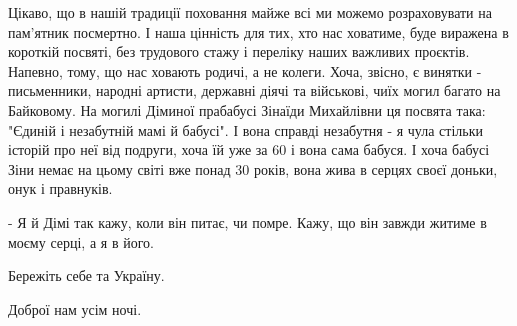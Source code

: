Цікаво, що в нашій традиції поховання майже всі ми можемо розраховувати на
пам'ятник посмертно. І наша цінність для тих, хто нас ховатиме, буде виражена в
короткій посвяті, без трудового стажу і переліку наших важливих проєктів.
Напевно, тому, що нас ховають родичі, а не колеги. Хоча, звісно, є винятки -
письменники, народні артисти, державні діячі та військові, чиїх могил багато на
Байковому. На могилі Діминої прабабусі Зінаїди Михайлівни ця посвята така:
"Єдиній і незабутній мамі й бабусі". І вона справді незабутня - я чула стільки
історій про неї від подруги, хоча їй уже за 60 і вона сама бабуся. І хоча
бабусі Зіни немає на цьому світі вже понад 30 років, вона жива в серцях своєї
доньки, онук і правнуків.

- Я й Дімі так кажу, коли він питає, чи помре. Кажу, що він завжди житиме в
моєму серці, а я в його.

Бережіть себе та Україну.

Доброї нам усім ночі.

